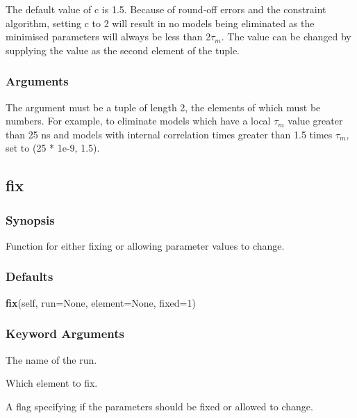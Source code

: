  The default value of c is 1.5.  Because of round-off errors and the constraint algorithm, setting c to 2 will result in no models being eliminated as the minimised parameters will always be less than 2$\tau_m$.  The value can be changed by supplying the value as the second element of the tuple. 
  

  
 \subsubsection{Arguments} 

 The  argument must be a tuple of length 2, the elements of which must be numbers.  For example, to eliminate models which have a local $\tau_m$ value greater than 25 ns and models with internal correlation times greater than 1.5 times $\tau_m$, set  to (25 * 1e-9, 1.5). 
  

  

 \newpage 

 \subsection{fix} 

  
 \subsubsection{Synopsis} 

 Function for either fixing or allowing parameter values to change. 
  

  
 \subsubsection{Defaults} 

 \textsf{\textbf{fix}(self, run=None, element=None, fixed=1)} 

  
 \subsubsection{Keyword Arguments} 

   The name of the run.   

   Which element to fix.   

   A flag specifying if the parameters should be fixed or allowed to change.  

